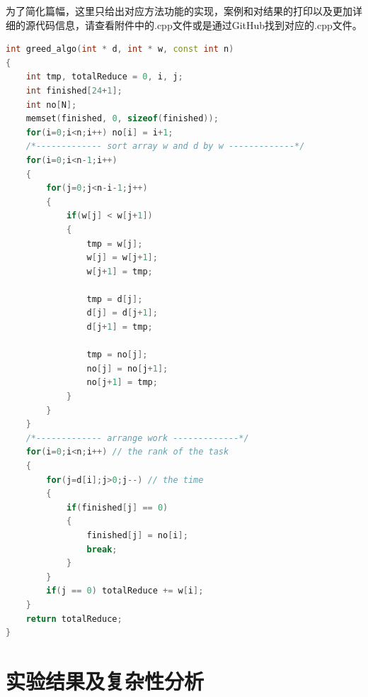 \documentclass[11pt]{ctexart}
\begin{document}
为了简化篇幅，这里只给出对应方法功能的实现，案例和对结果的打印以及更加详细的源代码信息，请查看附件中的.cpp文件或是通过GitHub找到对应的.cpp文件。
\begin{lstlisting}[language=C++]
int greed_algo(int * d, int * w, const int n)
{
    int tmp, totalReduce = 0, i, j;
    int finished[24+1];
    int no[N];
    memset(finished, 0, sizeof(finished));
    for(i=0;i<n;i++) no[i] = i+1;
    /*------------- sort array w and d by w -------------*/
    for(i=0;i<n-1;i++)
    {
        for(j=0;j<n-i-1;j++)
        {
            if(w[j] < w[j+1])
            {
                tmp = w[j];
                w[j] = w[j+1];
                w[j+1] = tmp;

                tmp = d[j];
                d[j] = d[j+1];
                d[j+1] = tmp;

                tmp = no[j];
                no[j] = no[j+1];
                no[j+1] = tmp;
            }
        }
    }
    /*------------- arrange work -------------*/
    for(i=0;i<n;i++) // the rank of the task
    {
        for(j=d[i];j>0;j--) // the time
        {
            if(finished[j] == 0)
            {
                finished[j] = no[i];
                break;
            }
        }
        if(j == 0) totalReduce += w[i];
    }
    return totalReduce;
}
\end{lstlisting}

\section{实验结果及复杂性分析}
\end{document}
